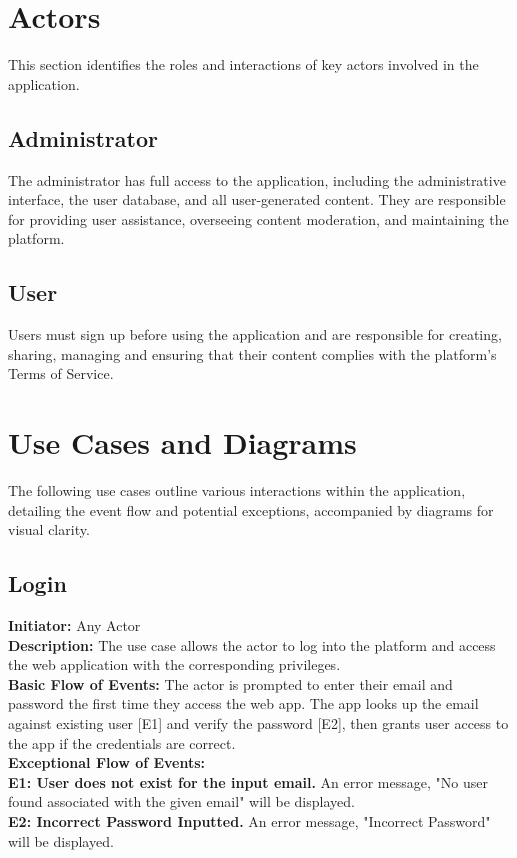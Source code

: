 \documentclass[a4paper,11pt]{scrreprt}
\begin{document}
\section{Actors}
\noindent This section identifies the roles and interactions of key actors involved in the application.
\subsection{Administrator}
The administrator has full access to the application, including the administrative interface, the user database, and all user-generated content. They are responsible for providing user assistance, overseeing content moderation, and maintaining the platform.

\subsection{User}
Users must sign up before using the application and are responsible for creating, sharing, managing and ensuring that their content complies with the platform's Terms of Service.

\section{Use Cases and Diagrams}
\noindent The following use cases outline various interactions within the application, detailing the event flow and potential exceptions, accompanied by diagrams for visual clarity.

\subsection{Login}
\textbf{\large Initiator: }Any Actor\\
\textbf{\large Description: }The use case allows the actor to log into the platform and access the web application with the corresponding privileges.\\
\textbf{\large Basic Flow of Events: }The actor is prompted to enter their email and password the first time they access the web app. The app looks up the email against existing user [E1] and verify the password [E2], then grants user access to the app if the credentials are correct.\\
\textbf{\large Exceptional Flow of Events:}\\
\textbf{E1: User does not exist for the input email. }An error message, "No user found associated with the given email" will be displayed.\\
\textbf{E2: Incorrect Password Inputted.} An error message, "Incorrect Password" will be displayed.
\end{document}
